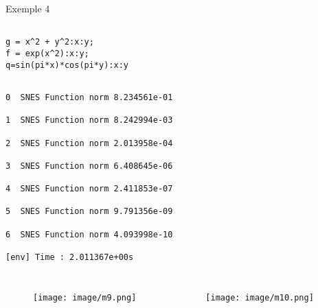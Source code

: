 \documentclass[11pt]{beamer}
\begin{document}






\begin{frame}{Exemple 4}

\begin{verbatim}

g = x^2 + y^2:x:y; 
f = exp(x^2):x:y; 
q=sin(pi*x)*cos(pi*y):x:y
\end{verbatim}


\begin{verbatim}

0  SNES Function norm 8.234561e-01

1  SNES Function norm 8.242994e-03

2  SNES Function norm 2.013958e-04

3  SNES Function norm 6.408645e-06

4  SNES Function norm 2.411853e-07

5  SNES Function norm 9.791356e-09

6  SNES Function norm 4.093998e-10

[env] Time : 2.011367e+00s
\end{verbatim}


\end{frame}



\begin{frame}
\begin{columns}
\begin{figure}
\texttt{[image: image/m9.png]}
\end{figure}
\begin{figure}
\texttt{[image: image/m10.png]}
\end{figure}
\end{columns}
\end{frame}


\end{document}
